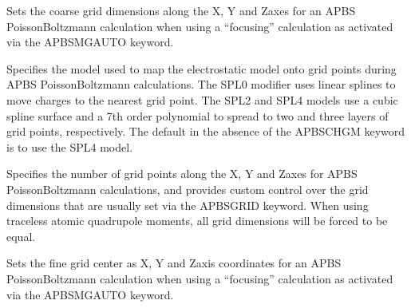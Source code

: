 \documentclass[letterpaper,11pt,english]{sphinxmanual}
\begin{document}
\ignorespaces {}\label{\detokenize{text/keywords:key-apbs-cgrid}}\begin{description}
\sphinxAtStartPar
Sets the coarse grid dimensions along the X\sphinxhyphen{}, Y\sphinxhyphen{} and Z\sphinxhyphen{}axes for an APBS Poisson\sphinxhyphen{}Boltzmann calculation when using a “focusing” calculation as activated via the APBS\sphinxhyphen{}MG\sphinxhyphen{}AUTO keyword.

\end{description}

\ignorespaces 
{}\ignorespaces {}\label{\detokenize{text/keywords:key-apbs-dime}}\label{\detokenize{text/keywords:key-apbs-chgm}}\begin{description}
\sphinxAtStartPar
Specifies the model used to map the electrostatic model onto grid points during APBS Poisson\sphinxhyphen{}Boltzmann calculations. The SPL0 modifier uses linear splines to move charges to the nearest grid point. The SPL2 and SPL4 models use a cubic spline surface and a 7th order polynomial to spread to two and three layers of grid points, respectively. The default in the absence of the APBS\sphinxhyphen{}CHGM keyword is to use the SPL4 model.

\sphinxAtStartPar
Specifies the number of grid points along the X\sphinxhyphen{}, Y\sphinxhyphen{} and Z\sphinxhyphen{}axes for APBS Poisson\sphinxhyphen{}Boltzmann calculations, and provides custom control over the grid dimensions that are usually set via the APBS\sphinxhyphen{}GRID keyword. When using traceless atomic quadrupole moments, all grid dimensions will be forced to be equal.

\end{description}

\ignorespaces {}\label{\detokenize{text/keywords:key-apbs-fgcent}}\begin{description}
\sphinxAtStartPar
Sets the fine grid center as X\sphinxhyphen{}, Y\sphinxhyphen{} and Z\sphinxhyphen{}axis coordinates for an APBS Poisson\sphinxhyphen{}Boltzmann calculation when using a “focusing” calculation as activated via the APBS\sphinxhyphen{}MG\sphinxhyphen{}AUTO keyword.

\end{description}
\end{document}
